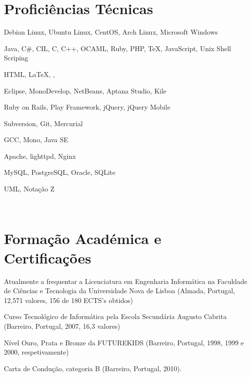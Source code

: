 \documentclass[a4paper,fontsize=10pt]{scrartcl} %
\begin{document}
\begin{minipage}[t]{0.46\textwidth} %

\vspace{0pt} %
	
\section{Proficiências Técnicas}
\begin{inparaitem}
\item[] Debian Linux, Ubuntu Linux, CentOS, Arch Linux,  Microsoft Windows
\item Java, C\#, CIL, C, C++, OCAML, Ruby, PHP, \TeX, JavaScript, Unix Shell Scriping
\item HTML, \LaTeX, \XeTeX, \XeLaTeX\
\item Eclipse, MonoDevelop, NetBeans, Aptana Studio, Kile
\item Ruby on Rails, Play Framework, jQuery, jQuery Mobile
\item Subversion, Git, Mercurial
\item GCC, Mono, Java SE 
\item Apache, lighttpd, Nginx
\item MySQL, PostgreSQL, Oracle, SQLite
\item UML, Nota\c{c}ão Z
\end{inparaitem}\\\par
\section{Forma\c{c}ão Académica e Certifica\c{c}ões}
\begin{inparaitem}
\item[] Atualmente a frequentar a Licenciatura em Engenharia Informática na Faculdade de Ciências e Tecnologia da Universidade Nova de Lisboa (Almada, Portugal, 12,571 valores, 156 de 180 ECTS's obtidos)
\item Curso Tecnológico de Informática pela Escola Secundária Augusto Cabrita (Barreiro, Portugal, 2007, 16,3 valores)
\item Nível Ouro, Prata e Bronze da FUTUREKIDS (Barreiro, Portugal, 1998, 1999 e 2000, respetivamente)
\item Carta de Condu\c{c}ão, categoria B (Barreiro, Portugal, 2010).
\end{inparaitem}
\\\par

\end{minipage}
\end{document}
